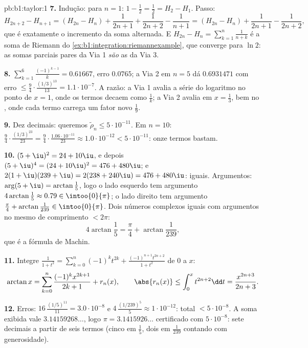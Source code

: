 \begin{solution}{pb:b1:taylor:1}
\textbf{7.} Indução: para $n = 1$: $1 - \frac12 = \frac12 = H_2
- H_1$. Passo:
\[
H_{2n+2} - H_{n+1} = (H_{2n} - H_n) + \frac{1}{2n+1} +
\frac{1}{2n+2} - \frac{1}{n+1}
= (H_{2n} - H_n) + \frac{1}{2n+1} - \frac{1}{2n+2},
\]
que é exatamente o incremento da soma alternada. E
$H_{2n} - H_n = \sum_{k=1}^{n}\frac{1}{n+k}$ é a soma de Riemann do \cref{ex:b1:integration:riemannexample}, que converge para $\ln
2$: as somas parciais pares da Via 1 \emph{são} as 
da Via 3.

\textbf{8.} $\sum_{k=1}^{6}\frac{(-1)^{k-1}}{k} = 0.61667$,
erro $0.0765$; a Via 2 em $n = 5$ dá $0.6931471$ com erro
$\leq \frac94\cdot\frac{(1/3)^{13}}{13} = 1.1\cdot10^{-7}$. A
razão: a Via 1 avalia a série do logaritmo no ponto de 
$x = 1$, onde os termos decaem como $\frac1k$; a Via 2
avalia em $x = \frac13$, bem no , onde cada termo carrega
um fator novo $\frac19$.

\textbf{9.} Dez decimais: queremos $\tilde\rho_n \leq
5\cdot10^{-11}$. Em $n = 10$: $\frac94 \cdot
\frac{(1/3)^{23}}{23} = \frac94\cdot\frac{1.06\cdot10^{-11}}{23}
\approx 1.0\cdot10^{-12} < 5\cdot10^{-11}$: onze
termos bastam.

\textbf{10.} $(5+\iu)^2 = 24 + 10\iu$, e depois $(5+\iu)^4 = (24 +
10\iu)^2 = 476 + 480\iu$; e $2(1+\iu)(239+\iu) = 2(238 +
240\iu) = 476 + 480\iu$: iguais. Argumentos:
$\arg(5 + \iu) =
\arctan\frac15$, logo o lado esquerdo tem argumento
$4\arctan\frac15 \approx 0.79 \in \intoo{0}{\pi}$; o lado
direito tem argumento $\frac\pi4 + \arctan\frac{1}{239} \in
\intoo{0}{\pi}$. Dois números complexos iguais com
argumentos no mesmo  de comprimento $< 2\pi$:
\[
4\arctan\frac15 = \frac\pi4 + \arctan\frac{1}{239} ,
\]
que é a fórmula de Machin.

\textbf{11.} Integre $\frac{1}{1+t^2} = \sum_{k=0}^n (-1)^k
t^{2k} + \frac{(-1)^{n+1}t^{2n+2}}{1+t^2}$ de $0$ a $x$:
\[
\arctan x = \sum_{k=0}^{n}\frac{(-1)^k x^{2k+1}}{2k+1} +
r_n(x),
\qquad
\abs{r_n(x)} \leq \int_0^x t^{2n+2}\dd t =
\frac{x^{2n+3}}{2n+3} .
\]

\textbf{12.} Erros: $16\,\frac{(1/5)^{11}}{11} = 3.0\cdot
10^{-8}$ e $4\,\frac{(1/239)^5}{5} \approx 1\cdot10^{-12}$:
total $< 5\cdot10^{-8}$. A soma exibida vale
$3.14159268\dots$, logo $\pi = 3.1415926\dots$ certificado com
$5\cdot10^{-8}$: sete decimais a partir de seis termos (cinco em
$\frac15$, dois em $\frac1{239}$ contando com generosidade).


\end{solution}
